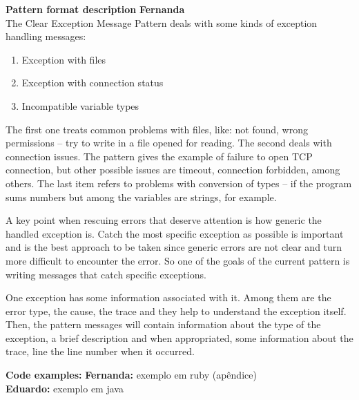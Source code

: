 \documentclass[12pt]{article}
\begin{document}
\begin{flushleft}
 
\textbf{Pattern format description} 
\textbf{Fernanda} \\

The Clear Exception Message Pattern deals with some kinds of exception handling messages:
 \begin{enumerate}
 \item Exception with files
 \item Exception with connection status
 \item Incompatible variable types 
  \end{enumerate} 
 
The first one treats common problems with files, like: not found, wrong permissions -- try to write in a file opened for reading. The second deals with connection issues. The pattern gives the example of failure to open TCP connection, but other possible issues are timeout, connection forbidden, among others. The last item refers to problems with conversion of types -- if the program sums numbers but among the variables are strings, for example.

A key point when rescuing errors that deserve attention is how generic the handled exception is. Catch the most specific exception as possible is important and is the best approach to be taken since generic errors are not clear and turn more difficult to encounter the error. So one of the goals of the current pattern is writing messages that catch specific exceptions. 
 
One exception has some information associated with it. Among them are the error type, the cause, the trace and they help to understand the exception itself. Then, the pattern messages will contain information about the type of the exception, a brief description and when appropriated, some information about the trace, line the line number when it occurred.
 

\textbf{Code examples:}
\textbf{ Fernanda:} exemplo em ruby (apêndice) \\
\textbf{ Eduardo:} exemplo em java
 
 
 


% 




\end{flushleft}
\end{document}
